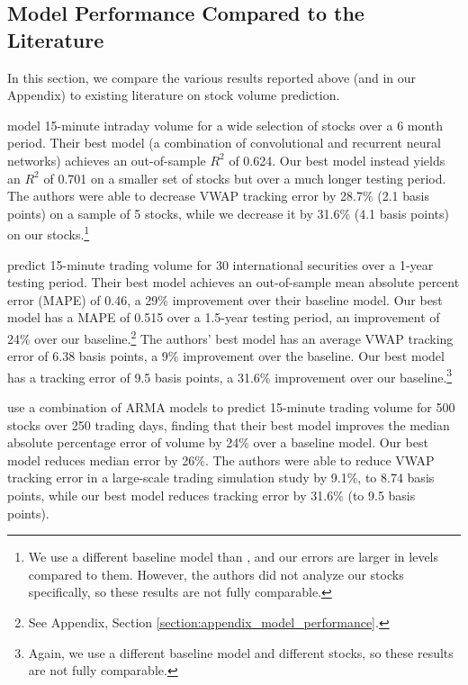 \documentclass[12pt]{article}
\begin{document}
\subsection{Model Performance Compared to the Literature}
In this section, we compare the various results reported above (and in our Appendix) to existing literature on stock volume prediction.

\textcite{cucuringu2025forecasting} model 15-minute intraday volume for a wide selection of stocks over a 6 month period. Their best model (a combination of convolutional and recurrent neural networks) achieves an out-of-sample $R^2$ of 0.624. Our best model instead yields an $R^2$ of 0.701 on a smaller set of stocks but over a much longer testing period. The authors were able to decrease VWAP tracking error by 28.7\% (2.1 basis points) on a sample of 5 stocks, while we decrease it by 31.6\% (4.1 basis points) on our stocks.\footnote{We use a different baseline model than \textcite{cucuringu2025forecasting}, and our errors are larger in levels compared to them. However, the authors did not analyze our stocks specifically, so these results are not fully comparable.}

\textcite{chen2016forecasting} predict 15-minute trading volume for 30 international securities over a 1-year testing period. Their best model achieves an out-of-sample mean absolute percent error (MAPE) of 0.46, a 29\% improvement over their baseline model. Our best model has a MAPE of 0.515 over a 1.5-year testing period, an improvement of 24\% over our baseline.\footnote{See Appendix, Section \ref{section:appendix_model_performance}.} The authors' best model has an average VWAP tracking error of 6.38 basis points, a 9\% improvement over the baseline. Our best model has a tracking error of 9.5 basis points, a 31.6\% improvement over our baseline.\footnote{Again, we use a different baseline model and different stocks, so these results are not fully comparable.}

\textcite{satish2014predicting} use a combination of ARMA models to predict 15-minute trading volume for 500 stocks over 250 trading days, finding that their best model improves the median absolute percentage error of volume by 24\% over a baseline model. Our best model reduces median error by 26\%. The authors were able to reduce VWAP tracking error in a large-scale trading simulation study by 9.1\%, to 8.74 basis points, while our best model reduces tracking error by 31.6\% (to 9.5 basis points).
\end{document}
